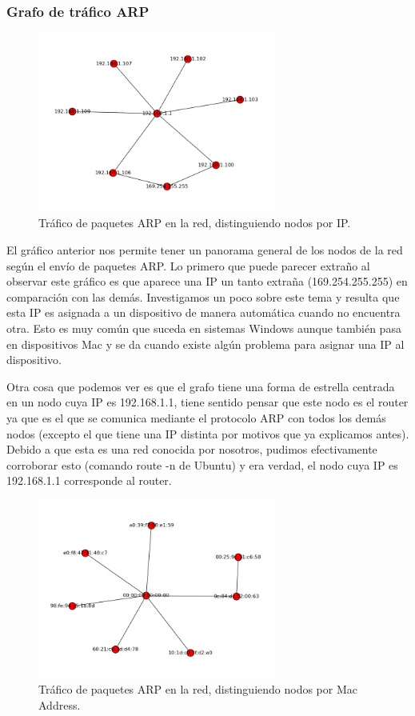 \documentclass{article}
\theoremstyle{definition}
\theoremstyle{remark}
\begin{document}
\subsubsection{Grafo de tráfico ARP}
\begin{figure}[H]
    \centering
    \includegraphics[width=0.70\textwidth]{../captures/CasaGerman/conn_ip.png}
    \caption{Tráfico de paquetes ARP en la red, distinguiendo nodos por IP.}
    \label{fig:mesh1}
\end{figure}
El gráfico anterior nos permite tener un panorama general de los nodos de la red según el envío de paquetes ARP. Lo primero que puede parecer extraño al observar este gráfico es que aparece una IP un tanto extraña (169.254.255.255) en comparación con las demás. Investigamos un poco sobre este tema y resulta que esta IP es asignada a un dispositivo de manera automática cuando no encuentra otra. Esto es muy común que suceda en sistemas Windows aunque también pasa en dispositivos Mac y se da cuando existe algún problema para asignar una IP al dispositivo.
\par Otra cosa que podemos ver es que el grafo tiene una forma de estrella centrada en un nodo cuya IP es 192.168.1.1, tiene sentido pensar que este nodo es el router ya que es el que se comunica mediante el protocolo ARP con todos los demás nodos (excepto el que tiene una IP distinta por motivos que ya explicamos antes). Debido a que esta es una red conocida por nosotros, pudimos efectivamente corroborar esto (comando route -n de Ubuntu) y era verdad, el nodo cuya IP es 192.168.1.1 corresponde al router.
\begin{figure}[H]
    \centering
    \includegraphics[width=0.70\textwidth]{../captures/CasaGerman/conn_mac.png}
    \caption{Tráfico de paquetes ARP en la red, distinguiendo nodos por Mac Address.}
    \label{fig:mesh1}
\end{figure}
\end{document}

